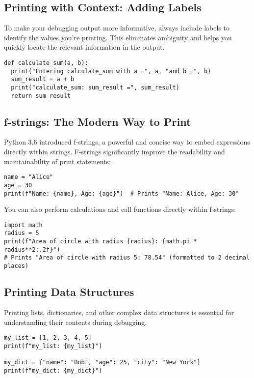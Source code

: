 \documentclass{article}
\begin{document}
{{{{\subsection*{Printing with Context: Adding Labels}

To make your debugging output more informative, always include labels to identify the values you're printing. This eliminates ambiguity and helps you quickly locate the relevant information in the output.

\begin{verbatim}
def calculate_sum(a, b):
  print("Entering calculate_sum with a =", a, "and b =", b)
  sum_result = a + b
  print("calculate_sum: sum_result =", sum_result)
  return sum_result
\end{verbatim}

\subsection*{f-strings: The Modern Way to Print}

Python 3.6 introduced f-strings, a powerful and concise way to embed expressions directly within strings. F-strings significantly improve the readability and maintainability of print statements:

\begin{verbatim}
name = "Alice"
age = 30
print(f"Name: {name}, Age: {age}")  # Prints "Name: Alice, Age: 30"
\end{verbatim}

You can also perform calculations and call functions directly within f-strings:

\begin{verbatim}
import math
radius = 5
print(f"Area of circle with radius {radius}: {math.pi * radius**2:.2f}")
# Prints "Area of circle with radius 5: 78.54" (formatted to 2 decimal places)
\end{verbatim}

\subsection*{Printing Data Structures}

Printing lists, dictionaries, and other complex data structures is essential for understanding their contents during debugging.

\begin{verbatim}
my_list = [1, 2, 3, 4, 5]
print(f"my_list: {my_list}")

my_dict = {"name": "Bob", "age": 25, "city": "New York"}
print(f"my_dict: {my_dict}")
\end{verbatim}

}}}}
\end{document}
